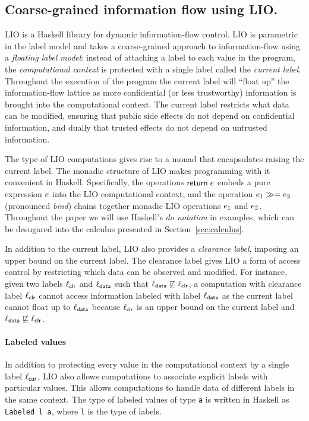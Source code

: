 \subsection{Coarse-grained information flow using LIO.}
LIO \cite{SRMMlio} is a Haskell library for dynamic information-flow control. LIO is parametric in the label model and takes a coarse-grained approach to information-flow using a \emph{floating label model}: instead of attaching a label to each value in the program, the \emph{computational context} is protected with a single label called the \emph{current label}. Throughout the execution of the program the current label will ``float up'' the information-flow lattice as more confidential (or less trustworthy) information is brought into the computational context. The current label restricts what data can be modified, ensuring that public side effects do not depend on confidential information, and dually that trusted effects do not depend on untrusted information.

The type of LIO computations gives rise to a monad \cite{Wadler:1995:MFP:647698.734146} that encapsulates raising the current label. The monadic structure of LIO makes programming with it convenient in Haskell. Specifically, the operations $\mathsf{return}\;e$ embeds a pure expression $e$ into the LIO computational context, and the operation $e_1 \gg= e_2$ (pronounced \emph{bind}) chains together monadic LIO operations $e_1$ and $e_2$. Throughout the paper we will use Haskell's \emph{do notation} in examples, which can be desugared into the calculus presented in Section~\ref{sec:calculus}.

In addition to the current label, LIO also provides a \emph{clearance label}, imposing an upper bound on the current label. The clearance label gives LIO a form of access control by restricting which data can be observed and modified. For instance, given two labels $\ell_{\mathsf{clr}}$ and $\ell_{\mathsf{data}}$ such that $\ell_{\mathsf{data}} \not\sqsubseteq \ell_{\mathsf{clr}}$, a computation with clearance label $\ell_{\mathsf{clr}}$ cannot access information labeled with label $\ell_{\mathsf{data}}$ as the current label cannot float up to $\ell_{\mathsf{data}}$ because $\ell_{\mathsf{clr}}$ is an upper bound on the current label and $\ell_{\mathsf{data}} \not\sqsubseteq \ell_{\mathsf{clr}}$.

\paragraph{Labeled values}
In addition to protecting every value in the computational context by a single label $\ell_{\mathsf{cur}}$, LIO also allows computations to associate explicit labels with particular values. This allows computations to handle data of different labels in the same context. The type of labeled values of type \texttt{a} is written in Haskell as \texttt{Labeled l a}, where \texttt{l} is the type of labels.

